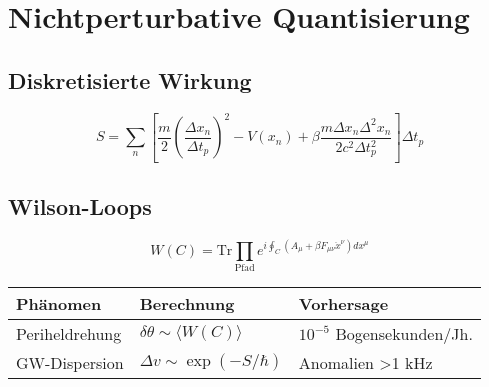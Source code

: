 \section{Nichtperturbative Quantisierung}

\subsection{Diskretisierte Wirkung}
\[
S = \sum_{n} \left[ 
\frac{m}{2} \left(\frac{\Delta x_n}{\Delta t_p}\right)^2 
- V(x_n) 
+ \beta \frac{m \Delta x_n \Delta^2 x_n}{2c^2 \Delta t_p^2}
\right] \Delta t_p
\]

\subsection{Wilson-Loops}
\[
W(C) = \text{Tr} \prod_{\text{Pfad}} e^{i \oint_C (A_\mu + \beta F_{\mu\nu} \ddot{x}^\nu) dx^\mu}
\]

\begin{table}[h]
\centering
\begin{tabular}{|l|l|l|}
\hline
\textbf{Phänomen} & \textbf{Berechnung} & \textbf{Vorhersage} \\ \hline
Periheldrehung & $\delta \theta \sim \langle W(C) \rangle$ & $10^{-5}$ Bogensekunden/Jh. \\ \hline
GW-Dispersion & $\Delta v \sim \exp(-S/\hbar)$ & Anomalien >1 kHz \\ \hline
\end{tabular}
\end{table}